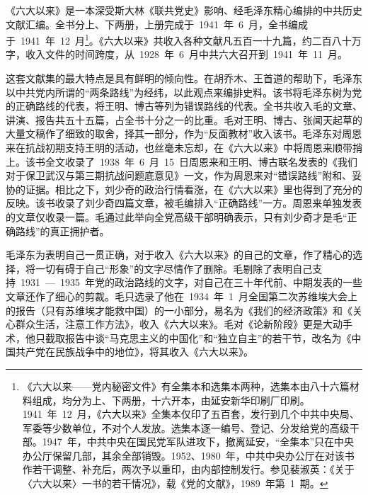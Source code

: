 《六大以来》是一本深受斯大林《联共党史》影响、经毛泽东精心编排的中共历史文献汇编。全书分上、下两册，上册完成于~1941~年~6~月，全书编成于~1941~年~12~月\footnote{《六大以来——党内秘密文件》有全集本和选集本两种，选集本由八十六篇材料组成，均分为上、下两册，十六开本，由延安新华印刷厂印刷。1941~年~12~月，《六大以来》全集本仅印了五百套，发行到几个中共中央局、军委等少数单位，不对个人发放。选集本逐一编号、登记、分发给党的高级干部。1947~年，中共中央在国民党军队进攻下，撤离延安，“全集本”只在中央办公厅保留几部，其余全部销毁。1952、1980~年，中共中央办公厅在对该书作若干调整、补充后，两次予以重印，由内部控制发行。参见裴淑英：《关于〈六大以来〉一书的若干情况》，载《党的文献》，1989~年第~1~期。}。《六大以来》共收入各种文献凡五百一十九篇，约二百八十万字，收入文件的时间跨度，从~1928~年~6~月中共六大召开到~1941~年~11~月。

这套文献集的最大特点是具有鲜明的倾向性。在胡乔木、王首道的帮助下，毛泽东以中共党内所谓的“两条路线”为经纬，以此观点来编排史料。该书将毛泽东树为党的正确路线的代表，将王明、博古等列为错误路线的代表。全书共收入毛的文章、讲演、报告共五十五篇，占全书十分之一的比重。毛对王明、博古、张闻天起草的大量文稿作了细致的取舍，择其一部分，作为“反面教材”收入该书。毛泽东对周恩来在抗战初期支持王明的活动，也丝毫未忘却，在《六大以来》中将周恩来顺带捎上。该书全文收录了~1938~年~6~月~15~日周恩来和王明、博古联名发表的《我们对于保卫武汉与第三期抗战问题底意见》一文，作为周恩来对“错误路线”附和、妥协的证据。相比之下，刘少奇的政治行情看涨，在《六大以来》里也得到了充分的反映。该书收录了刘少奇四篇文章，被毛编排入“正确路线”一方。周恩来单独发表的文章仅收录一篇。毛通过此举向全党高级干部明确表示，只有刘少奇才是毛“正确路线”的真正拥护者。

毛泽东为表明自己一贯正确，对于收入《六大以来》的自己的文章，作了精心的选择，将一切有碍于自己“形象”的文字尽情作了删除。毛剔除了表明自己支持~1931~—~1935~年党的政治路线的文字，对自己在三十年代前、中期发表的一些文章还作了细心的剪裁。毛只选录了他在~1934~年~1~月全国第二次苏维埃大会上的报告（只有苏维埃才能救中国）的一小部分，易名为《我们的经济政策》和《关心群众生活，注意工作方法》，收入《六大以来》。毛对《论新阶段》更是大动手术，他只截取报告中谈“马克思主义的中国化”和“独立自主”的若干节，改名为《中国共产党在民族战争中的地位》，将其收入《六大以来》。

